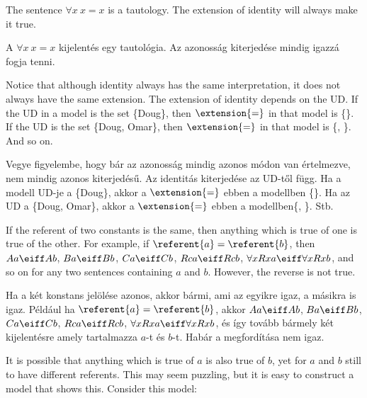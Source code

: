 The sentence $\forall x\ x=x$ is a tautology. The extension of identity will always make it true.

A $\forall x\ x=x$ kijelentés egy tautológia. Az azonosság kiterjedése mindig igazzá fogja tenni.

Notice that although identity always has the same interpretation, it does not always have the same extension. The extension of identity depends on the UD. If the UD in a model is the set \{Doug\}, then $\extension{=}$ in that model is \{\}. If the UD is the set \{Doug, Omar\}, then $\extension{=}$ in that model is \{, \}. And so on.

Vegye figyelembe, hogy bár az azonosság mindig azonos módon van értelmezve, nem mindig azonos kiterjedésű. Az identitás kiterjedése az UD-től függ. Ha a modell UD-je a \{Doug\}, akkor a $\extension{=}$ ebben a modellben \{\}. Ha az UD a \{Doug, Omar\}, akkor a $ \extension{=}$ ebben a modellben\{,  \}. Stb.

If the referent of two constants is the same, then anything which is true of one is true of the other. For example, if $\referent{a}=\referent{b}$, then $Aa\eiff Ab$, $Ba\eiff Bb$, $Ca\eiff Cb$, $Rca\eiff Rcb$, $\forall x Rxa\eiff \forall x Rxb$, and so on for any two sentences containing $a$ and $b$. However, the reverse is not true.

Ha a két konstans jelölése azonos, akkor bármi, ami az egyikre igaz, a másikra is igaz. Például ha $\referent{a}=\referent{b}$, akkor $Aa\eiff Ab$, $Ba\eiff Bb$, $Ca\eiff Cb$, $Rca\eiff Rcb$, $\forall x Rxa\eiff \forall x Rxb$, és így tovább bármely két kijelentésre amely tartalmazza $a$-t és $b$-t. Habár a megfordítása nem igaz.



\label{model.nonidentity}
It is possible that anything which is true of $a$ is also true of $b$, yet for $a$ and $b$ still to have different referents. This may seem puzzling, but it is easy to construct a model that shows this. Consider this model:


